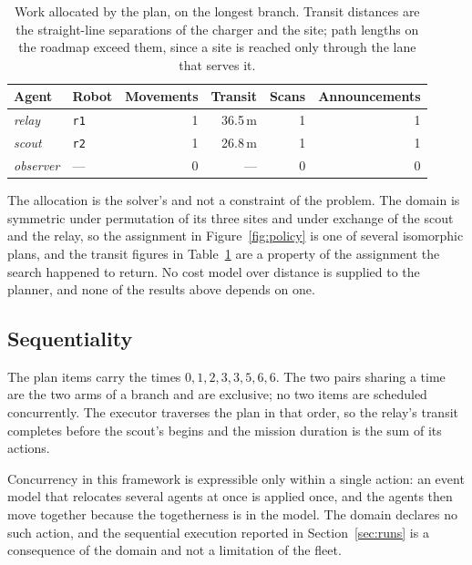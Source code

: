 \documentclass[11pt,a4paper]{article}
\theoremstyle{definition}
\newcommand{\code}[1]{\texttt{\small #1}}
\begin{document}
\begin{table}[H]
\centering\small
\caption{Work allocated by the plan, on the longest branch. Transit distances
are the straight-line separations of the charger and the site; path lengths on
the roadmap exceed them, since a site is reached only through the lane that
serves it.}
\label{tab:workload}
\begin{tabular}{@{}llrrrr@{}}
\toprule
\textbf{Agent} & \textbf{Robot} & \textbf{Movements} & \textbf{Transit}
  & \textbf{Scans} & \textbf{Announcements} \\
\midrule
\textit{relay}    & \code{r1} & 1 & 36.5\,m & 1 & 1 \\
\textit{scout}    & \code{r2} & 1 & 26.8\,m & 1 & 1 \\
\textit{observer} & ---       & 0 & ---     & 0 & 0 \\
\bottomrule
\end{tabular}
\end{table}

The allocation is the solver's and not a constraint of the problem. The domain
is symmetric under permutation of its three sites and under exchange of the
scout and the relay, so the assignment in Figure~\ref{fig:policy} is one of
several isomorphic plans, and the transit figures in
Table~\ref{tab:workload} are a property of the assignment the search happened
to return. No cost model over distance is supplied to the planner, and none of
the results above depends on one.

\subsection{Sequentiality}

The plan items carry the times $0,1,2,3,3,5,6,6$. The two pairs sharing a time
are the two arms of a branch and are exclusive; no two items are scheduled
concurrently. The executor traverses the plan in that order, so the relay's
transit completes before the scout's begins and the mission duration is the sum
of its actions.

Concurrency in this framework is expressible only within a single action:
an event model that relocates several agents at once is applied once, and the
agents then move together because the togetherness is in the model. The domain
declares no such action, and the sequential execution reported in
Section~\ref{sec:runs} is a consequence of the domain and not a limitation of
the fleet.

\end{document}
